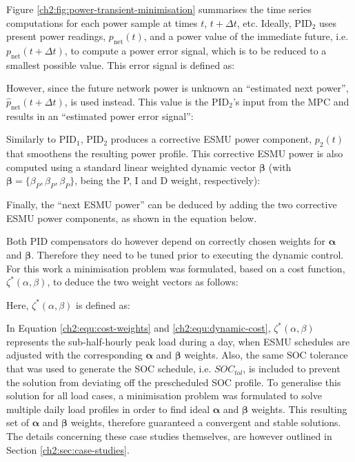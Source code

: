 

Figure \ref{ch2:fig:power-transient-minimisation} summarises the time series computations for each power sample at times $t$, $t+\Delta t$, etc.
Ideally, PID$_2$ uses present power readings, $p_\text{net}(t)$, and a power value of the immediate future, i.e. $p_\text{net}(t+\Delta t)$, to compute a power error signal, which is to be reduced to a smallest possible value.
This error signal is defined as:



However, since the future network power is unknown an ``estimated next power'', $\hat{p}_\text{net}(t+\Delta t)$, is used instead.
This value is the PID$_2$'s input from the MPC and results in an ``estimated power error signal'':



Similarly to PID$_1$, PID$_2$ produces a corrective ESMU power component, $p_2(t)$ that smoothens the resulting power profile.
This corrective ESMU power is also computed using a standard linear weighted dynamic vector $\boldsymbol{\beta}$ (with $\boldsymbol{\beta} = \{\beta_P, \beta_P, \beta_P\}$, being the P, I and D weight, respectively):



Finally, the ``next ESMU power'' can be deduced by adding the two corrective ESMU power components, as shown in the equation below.



Both PID compensators do however depend on correctly chosen weights for $\boldsymbol{\alpha}$ and $\boldsymbol{\beta}$.
Therefore they need to be tuned prior to executing the dynamic control.
For this work a minimisation problem was formulated, based on a cost function, $\zeta^*(\alpha, \beta)$, to deduce the two weight vectors as follows:



Here, $\zeta^*(\alpha, \beta)$ is defined as:



In Equation \ref{ch2:equ:cost-weights} and \ref{ch2:equ:dynamic-cost}, $\zeta^*(\alpha, \beta)$ represents the sub-half-hourly peak load during a day, when ESMU schedules are adjusted with the corresponding $\boldsymbol{\alpha}$ and $\boldsymbol{\beta}$ weights.
Also, the same SOC tolerance that was used to generate the SOC schedule, i.e. $SOC_{tol}$, is included to prevent the solution from deviating off the prescheduled SOC profile.
To generalise this solution for all load cases, a minimisation problem was formulated to solve multiple daily load profiles in order to find ideal $\boldsymbol{\alpha}$ and $\boldsymbol{\beta}$ weights.
This resulting set of $\boldsymbol{\alpha}$ and $\boldsymbol{\beta}$ weights, therefore guaranteed a convergent and stable solutions.
The details concerning these case studies themselves, are however outlined in Section \ref{ch2:sec:case-studies}.

